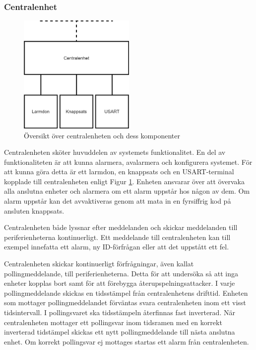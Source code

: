 \documentclass[a4paper]{article}
\begin{document}
\subsubsection{Centralenhet}
\begin{figure}[H]
    \centering
    \includegraphics[width=0.5\textwidth]{central-oversikt-pp.png}
    \caption{Översikt över centralenheten och dess komponenter}
    \label{fig:oversiktcentral}
\end{figure}

Centralenheten sköter huvuddelen av systemets funktionalitet.
En del av funktionaliteten är att kunna alarmera, avalarmera och konfigurera systemet.
För att kunna göra detta är ett larmdon, en knappsats och en USART-terminal kopplade till centralenheten enligt Figur \ref{fig:oversiktcentral}.
Enheten ansvarar över att övervaka alla anslutna enheter och alarmera om ett alarm uppstår hos någon av dem.
Om alarm uppstår kan det avvaktiveras genom att mata in en fyrsiffrig kod på ansluten knappsats.

Centralenheten både lyssnar efter meddelanden och skickar meddelanden till periferienheterna kontinuerligt.
Ett meddelande till centralenheten kan till exempel innefatta ett alarm, ny ID-förfrågan eller att det uppstått ett fel.

Centralenheten skickar kontinuerligt förfrågningar, även kallat pollingmeddelande, till periferienheterna.
Detta för att undersöka så att inga enheter kopplas bort samt för att förebygga återupspelningsattacker.
I varje pollingmeddelande skickas en tidsstämpel från centralenhetens drifttid.
Enheten som mottager pollingmeddelandet förväntas svara centralenheten inom ett visst tidsintervall.
I pollingsvaret ska tidsstämpeln återfinnas fast inverterad.
När centralenheten mottager ett pollingsvar inom tidsramen med en korrekt inverterad tidstämpel skickas ett nytt pollingmeddelande till nästa anslutna enhet.
Om korrekt pollingsvar ej mottages startas ett alarm från centralenheten.
\end{document}
